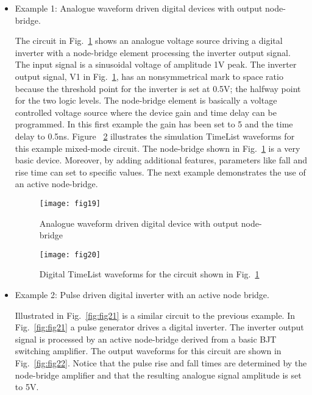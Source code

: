\begin{itemize}
\item Example 1: Analogue waveform driven digital devices with output node-bridge.

The circuit in Fig.~\ref{fig:fig19} shows an analogue voltage source
driving a digital inverter with a node-bridge element processing the
inverter output signal.  The input signal is a sinusoidal voltage of
amplitude 1V peak.  The inverter output signal, V1 in
Fig.~\ref{fig:fig19}, has an nonsymmetrical mark to space ratio
because the threshold point for the inverter is set at 0.5V; the
halfway point for the two logic levels.  The node-bridge element is
basically a voltage controlled voltage source where the device gain
and time delay can be programmed.  In this first example the gain has
been set to 5 and the time delay to 0.5ns.  Figure ~\ref{fig:fig20}
illustrates the simulation TimeList waveforms for this example
mixed-mode circuit. The node-bridge shown in Fig.~\ref{fig:fig19} is a
very basic device. Moreover, by adding additional features, parameters
like fall and rise time can set to specific values. The next example
demonstrates the use of an active node-bridge.

\begin{figure}[ht]
  \centering
	\texttt{[image: fig19]}
        \caption{Analogue waveform driven digital device with output node-bridge}
        \label{fig:fig19}
\end{figure} 

\begin{figure}[ht]
  \centering
	\texttt{[image: fig20]}
        \caption{Digital TimeList waveforms for the circuit shown in Fig.~\ref{fig:fig19}}
        \label{fig:fig20}
\end{figure} 
\FloatBarrier
\item Example 2: Pulse driven digital inverter with an active node bridge.

Illustrated in Fig.~\ref{fig:fig21} is a similar circuit to the
previous example.  In Fig.~\ref{fig:fig21} a pulse generator drives a
digital inverter. The inverter output signal is processed by an active
node-bridge derived from a basic BJT switching amplifier.  The output
waveforms for this circuit are shown in Fig.~\ref{fig:fig22}.  Notice
that the pulse rise and fall times are determined by the node-bridge
amplifier and that the resulting analogue signal amplitude is set to
5V.


\end{itemize}
